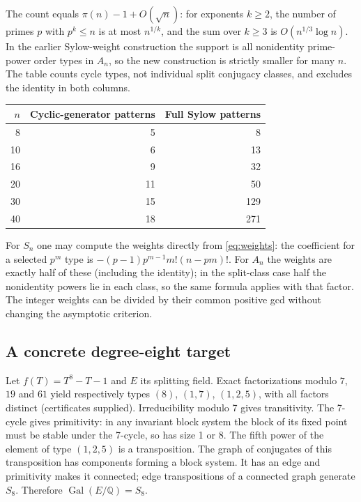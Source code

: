 \documentclass[11pt]{article}
\theoremstyle{remark}\newtheorem{remark}[theorem]{Remark}
\DeclareMathOperator{\Gal}{Gal}
\newcommand{\Q}{\mathbb Q}
\begin{document}
The count equals $\pi(n)-1+O(\sqrt n)$: for exponents $k\ge2$, the
number of primes $p$ with $p^k\le n$ is at most $n^{1/k}$, and the
sum over $k\ge3$ is $O(n^{1/3}\log n)$. In the earlier Sylow-weight
construction the support is all nonidentity prime-power order types
in $A_n$, so the new construction is strictly smaller for many $n$.
The table counts cycle types, not individual split conjugacy classes,
and excludes the identity in both columns.
\begin{center}
\begin{tabular}{rrr}\toprule
$n$ & Cyclic-generator patterns & Full Sylow patterns\\\midrule
8&5&8\\10&6&13\\16&9&32\\20&11&50\\30&15&129\\40&18&271\\\bottomrule
\end{tabular}
\end{center}
For $S_n$ one may compute the weights directly from
\eqref{eq:weights}: the coefficient for a selected $p^m$ type is
$-(p-1)p^{m-1}m!(n-pm)!$. For $A_n$ the weights are exactly half of
these (including the identity); in the split-class case half the
nonidentity powers lie in each class, so the same formula applies
with that factor. The integer weights can be divided by their common
positive gcd without changing the asymptotic criterion.

\subsection{A concrete degree-eight target}
Let $f(T)=T^8-T-1$ and $E$ its splitting field. Exact factorizations
modulo $7$, $19$ and $61$ yield respectively types $(8)$, $(1,7)$,
$(1,2,5)$, with all factors distinct (certificates supplied).
Irreducibility modulo 7 gives transitivity. The 7-cycle gives
primitivity: in any invariant block system the block of its fixed
point must be stable under the 7-cycle, so has size 1 or 8. The fifth
power of the element of type $(1,2,5)$ is a transposition. The graph
of conjugates of this transposition has components forming a block
system. It has an edge and primitivity makes it connected; edge
transpositions of a connected graph generate $S_8$. Therefore
$\Gal(E/\Q)=S_8$.
\end{document}
